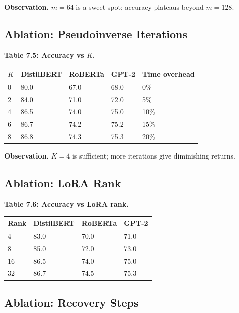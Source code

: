 \textbf{Observation.} $m = 64$ is a sweet spot; accuracy plateaus beyond $m = 128$.

\subsection{Ablation: Pseudoinverse Iterations}

\textbf{Table 7.5: Accuracy vs $K$.}

\begin{table}[H]
\centering
\small
\begin{tabular}{lllll}
\toprule
\textbf{$K$} & \textbf{DistilBERT} & \textbf{RoBERTa} & \textbf{GPT-2} & \textbf{Time overhead} \\
\midrule
0 & 80.0 & 67.0 & 68.0 & 0\% \\
2 & 84.0 & 71.0 & 72.0 & 5\% \\
4 & 86.5 & 74.0 & 75.0 & 10\% \\
6 & 86.7 & 74.2 & 75.2 & 15\% \\
8 & 86.8 & 74.3 & 75.3 & 20\% \\
\bottomrule
\end{tabular}
\end{table}

\textbf{Observation.} $K = 4$ is sufficient; more iterations give diminishing returns.

\subsection{Ablation: LoRA Rank}

\textbf{Table 7.6: Accuracy vs LoRA rank.}

\begin{table}[H]
\centering
\small
\begin{tabular}{llll}
\toprule
\textbf{Rank} & \textbf{DistilBERT} & \textbf{RoBERTa} & \textbf{GPT-2} \\
\midrule
4 & 83.0 & 70.0 & 71.0 \\
8 & 85.0 & 72.0 & 73.0 \\
16 & 86.5 & 74.0 & 75.0 \\
32 & 86.7 & 74.5 & 75.3 \\
\bottomrule
\end{tabular}
\end{table}

\subsection{Ablation: Recovery Steps}

